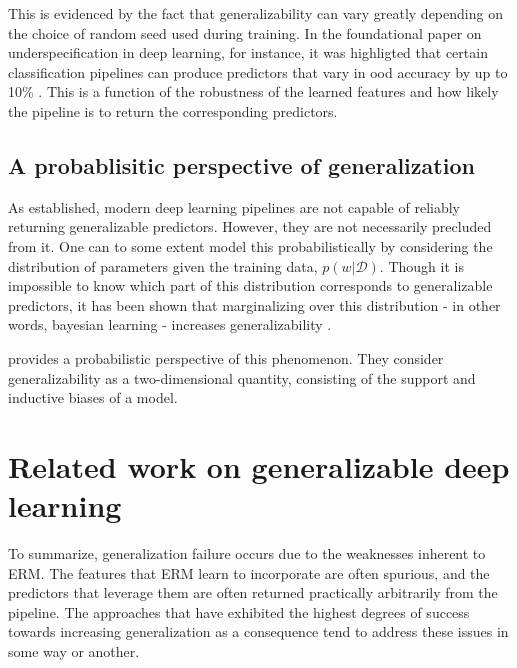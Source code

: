 		This is evidenced by the fact that generalizability can vary greatly depending on the choice of random seed used during training. In the foundational paper on underspecification in deep learning, for instance, it was highligted that certain classification pipelines can produce predictors that vary in ood accuracy by up to 10\% \cite{damour2020underspecification}. This is a function of the robustness of the learned features and how likely the pipeline is to return the corresponding predictors. 
	\subsection{A probablisitic perspective of generalization}
		As established, modern deep learning pipelines are not capable of reliably returning generalizable predictors. However, they are not necessarily precluded from it. One can to some extent model this probabilistically by considering the distribution of parameters given the training data, \(p(w | \mathcal{D})\). Though it is impossible to know which part of this distribution corresponds to generalizable predictors, it has been shown that marginalizing over this distribution - in other words, bayesian learning - increases generalizability \cite{bayesian_generalization,endoensemble,divergentnets,ensemble_machinereading}. 

		\cite{bayesian_generalization} provides a probabilistic perspective of this phenomenon. They consider generalizability as a two-dimensional quantity, consisting of the support and inductive biases of a model.

\section{Related work on generalizable deep learning}
To summarize, generalization failure occurs due to the weaknesses inherent to ERM. The features that ERM learn to incorporate are often spurious, and the predictors that leverage them are often returned practically arbitrarily from the pipeline. The approaches that have exhibited the highest degrees of success towards increasing generalization as a consequence tend to address these issues in some way or another. 

